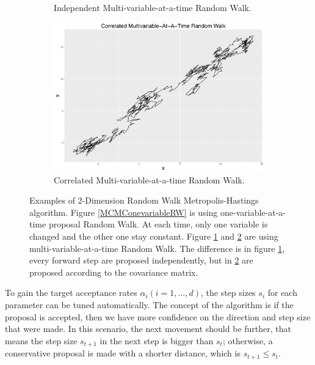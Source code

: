 \begin{figure}[h]
\begin{subfigure}[b]{0.32\textwidth}
    \caption{\footnotesize Independent Multi-variable-at-a-time Random Walk.}\label{MCMCMultivariableRW}
\end{subfigure}
\begin{subfigure}[b]{0.32\textwidth}
     \includegraphics[width=\textwidth]{Chapters/05MCMCOU/plots/ggcorRW.pdf}   
    \caption{\footnotesize Correlated Multi-variable-at-a-time Random Walk.}\label{MCMCCorrelatedRW}
\end{subfigure}
\caption{Examples of 2-Dimension Random Walk Metropolis-Hastings algorithm. Figure \ref{MCMConevariableRW} is using one-variable-at-a-time proposal Random Walk. At each time, only one variable is changed and the other one stay constant. Figure \ref{MCMCMultivariableRW} and \ref{MCMCCorrelatedRW} are using multi-variable-at-a-time Random Walk. The difference is in figure \ref{MCMCMultivariableRW}, every forward step are proposed independently, but in \ref{MCMCCorrelatedRW} are proposed according to the covariance matrix. }
\label{randomwalk}
\end{figure}
To gain the target acceptance rates $\alpha_i (i = 1, \dots, d)$, the step sizes $s_i$ for each parameter can be tuned automatically. The concept of the algorithm is if the proposal is accepted, then we have more confidence on the direction and step size that were made. In this scenario, the next movement should be further, that means the step size $s_{t+1}$ in the next step is bigger than $s_t$; otherwise, a conservative proposal is made with a shorter distance, which is $s_{t+1}\leq s_t$. 

